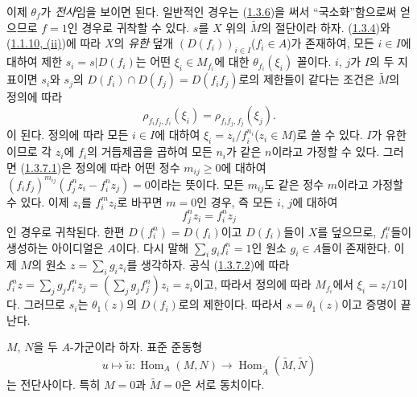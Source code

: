 이제 $\theta_f$가 \emph{전사}임을 보이면 된다. 일반적인 경우는
(\hyperref[I.1.3.6-ko]{1.3.6})을 써서 ``국소화''함으로써 얻으므로
$f=1$인 경우로 귀착할 수 있다. $s$를 $X$ 위의
$\widetilde{M}$의 절단이라 하자. (\hyperref[I.1.3.4-ko]{1.3.4})와
(\hyperref[I.1.1.10-ko]{1.1.10, (ii)})에 따라 $X$의 \emph{유한}
덮개 $(D(f_i))_{i\in I}$($f_i\in A$)가 존재하여, 모든 $i\in I$에
대하여 제한 $s_i=s|D(f_i)$는 어떤 $\xi_i\in M_{f_i}$에 대한
$\theta_{f_i}(\xi_i)$ 꼴이다. $i$, $j$가 $I$의 두 지표이면 $s_i$와
$s_j$의 $D(f_i)\cap D(f_j)=D(f_i f_j)$로의 제한들이 같다는 조건은
$\widetilde{M}$의 정의에 따라
\begin{equation}
  \rho_{f_i f_j,f_i}(\xi_i)=\rho_{f_i f_j,f_j}(\xi_j).
  \tag{1.3.7.1}\label{I.1.3.7.1-ko}
\end{equation}
이 된다. 정의에 따라 모든 $i\in I$에 대하여
$\xi_i=z_i/f_i^{n_i}$($z_i\in M$)로 쓸 수 있다. $I$가 유한이므로
각 $z_i$에 $f_i$의 거듭제곱을 곱하여 모든 $n_i$가 같은 $n$이라고
가정할 수 있다. 그러면 (\hyperref[I.1.3.7.1-ko]{1.3.7.1})은
정의에 따라 어떤 정수 $m_{ij}\geq0$에 대하여
$(f_i f_j)^{m_{ij}}(f_j^n z_i-f_i^n z_j)=0$이라는 뜻이다. 모든
$m_{ij}$도 같은 정수 $m$이라고 가정할 수 있다. 이제 $z_i$를
$f_i^m z_i$로 바꾸면 $m=0$인 경우, 즉 모든 $i$, $j$에 대하여
\begin{equation}
  f_j^n z_i=f_i^n z_j
  \tag{1.3.7.2}\label{I.1.3.7.2-ko}
\end{equation}
인 경우로 귀착된다. 한편 $D(f_i^n)=D(f_i)$이고 $D(f_i)$들이 $X$를
덮으므로, $f_i^n$들이 생성하는 아이디얼은 $A$이다. 다시 말해
$\sum_i g_i f_i^n=1$인 원소 $g_i\in A$들이 존재한다. 이제
$M$의 원소 $z=\sum_i g_i z_i$를 생각하자. 공식
(\hyperref[I.1.3.7.2-ko]{1.3.7.2})에 따라
$f_i^n z=\sum_j g_j f_i^n z_j=(\sum_j g_j f_j^n)z_i=z_i$이고,
따라서 정의에 따라 $M_{f_i}$에서 $\xi_i=z/1$이다.
그러므로 $s_i$는 $\theta_1(z)$의 $D(f_i)$로의 제한이다. 따라서
$s=\theta_1(z)$이고 증명이 끝난다.

\begin{corollary}[1.3.8]
\label{I.1.3.8-ko}
$M$, $N$을 두 $A$-가군이라 하자. 표준 준동형
\[
  u\longmapsto\widetilde{u}:
  \operatorname{Hom}_A(M,N)\longrightarrow
  \operatorname{Hom}_{\widetilde{A}}(\widetilde{M},\widetilde{N})
\]
는 전단사이다. 특히 $M=0$과 $\widetilde{M}=0$은 서로 동치이다.
\end{corollary}

